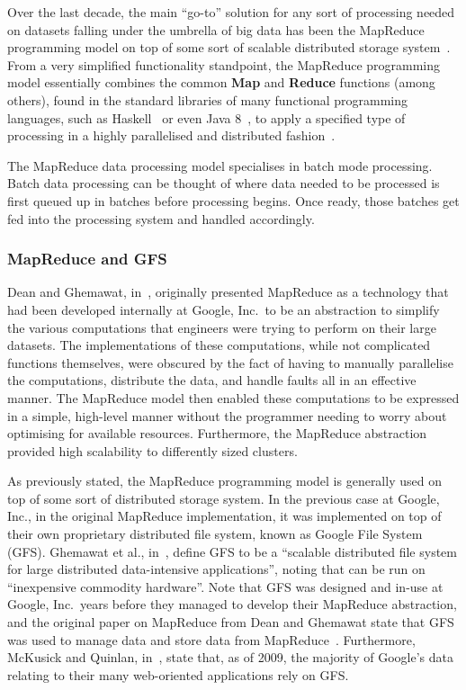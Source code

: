 \documentclass[a4paper,11pt]{article}
\begin{document}
Over the last decade, the main ``go-to'' solution for any sort of processing needed on datasets falling under the
umbrella of big data has been the MapReduce programming model on top of some sort of scalable distributed storage
system~\cite{bifet_mining_2013}. From a very simplified functionality standpoint, the MapReduce programming model essentially
combines the common \textbf{Map} and \textbf{Reduce} functions (among others), found in the standard libraries of many functional
programming languages, such as Haskell~\cite{lammel2008google} or even Java 8~\cite{su2014changing}, to apply a specified
type of processing in a highly parallelised and distributed fashion~\cite{yang2007map}.

The MapReduce data processing model specialises in batch mode processing. Batch data processing can be thought of where
data needed to be processed is first queued up in batches before processing begins. Once ready, those batches get fed
into the processing system and handled accordingly. %

\subsubsection{MapReduce and GFS} %
\label{ssub:mapreduce_and_gfs}

Dean and Ghemawat, in~\cite{dean_mapreduce:_2008}, originally presented MapReduce as a technology that had been
developed internally at Google, Inc.\ to be an abstraction to simplify the various computations that engineers were
trying to perform on their large datasets. The implementations of these computations, while not complicated functions
themselves, were obscured by the fact of having to manually parallelise the computations, distribute the data, and
handle faults all in an effective manner. The MapReduce model then enabled these computations to be expressed in a
simple, high-level manner without the programmer needing to worry about optimising for available resources. Furthermore,
the MapReduce abstraction provided high scalability to differently sized clusters.

As previously stated, the MapReduce programming model is generally used on top of some sort of distributed storage
system. In the previous case at Google, Inc., in the original MapReduce implementation, it was implemented on top of
their own proprietary distributed file system, known as Google File System (GFS). Ghemawat et al.,
in~\cite{ghemawat_google_2003}, define GFS to be a ``scalable distributed file system for large distributed data-intensive
applications'', noting that can be run on ``inexpensive commodity hardware''. Note that GFS was designed and in-use
at Google, Inc.\ years before they managed to develop their MapReduce abstraction, and the original paper on MapReduce
from Dean and Ghemawat state that GFS was used to manage data and store data from MapReduce~\cite{dean_mapreduce:_2008}.
Furthermore, McKusick and Quinlan, in~\cite{mckusick2009gfs}, state that, as of 2009, the majority of Google's data
relating to their many web-oriented applications rely on GFS.
\end{document}
